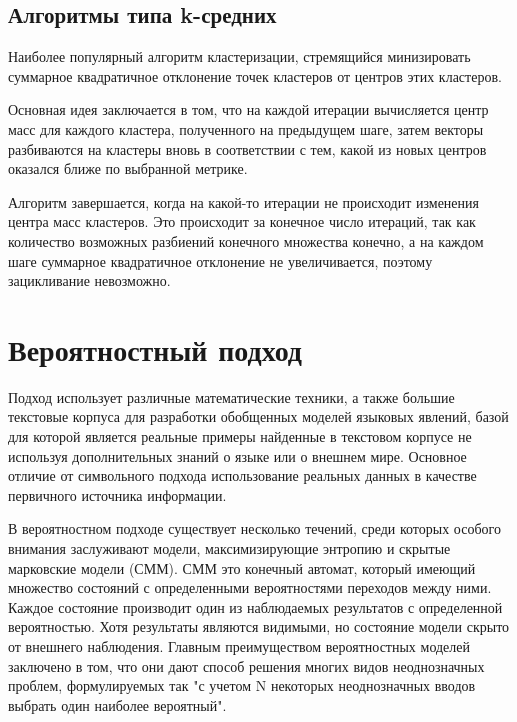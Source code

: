 \documentclass{standalone}
\begin{document}
\subsection{Алгоритмы типа k-средних} %

\par Наиболее популярный алгоритм кластеризации, стремящийся минизировать суммарное квадратичное отклонение точек кластеров от центров этих кластеров.
\par Основная идея заключается в том, что на каждой итерации вычисляется центр масс для каждого кластера, полученного на предыдущем шаге, затем векторы разбиваются на кластеры вновь в соответствии с тем, какой из новых центров оказался ближе по выбранной метрике.
\par Алгоритм завершается, когда на какой-то итерации не происходит изменения центра масс кластеров. Это происходит за конечное число итераций, так как количество возможных разбиений конечного множества конечно, а на каждом шаге суммарное квадратичное отклонение не увеличивается, поэтому зацикливание невозможно.

\section{Вероятностный подход}
\par Подход использует различные математические техники, а также большие текстовые корпуса для разработки обобщенных моделей языковых явлений, базой для которой является реальные примеры найденные в текстовом корпусе не используя дополнительных знаний о языке или о внешнем мире. Основное отличие от символьного подхода использование реальных данных в качестве первичного источника информации.
\par В вероятностном подходе существует несколько течений, среди которых особого внимания заслуживают модели, максимизирующие энтропию и скрытые марковские модели (СММ). СММ  это конечный автомат, который имеющий множество состояний с определенными вероятностями переходов между ними. Каждое состояние производит один из наблюдаемых результатов с определенной вероятностью. Хотя результаты являются видимыми, но состояние модели скрыто от внешнего наблюдения. Главным преимуществом вероятностных моделей заключено в том, что они дают способ решения многих видов неоднозначных проблем, формулируемых так "с учетом N некоторых неоднозначных вводов выбрать один наиболее вероятный".
\end{document}
